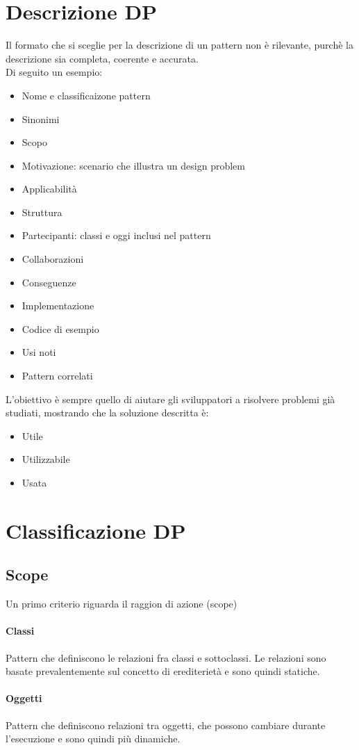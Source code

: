 \section{Descrizione DP}
Il formato che si sceglie per la descrizione di un pattern non è rilevante, purchè la descrizione
sia completa, coerente e accurata.\\
Di seguito un esempio:
\begin{itemize}
    \item Nome e classificaizone pattern
    \item Sinonimi
    \item Scopo
    \item Motivazione: scenario che illustra un design problem
    \item Applicabilità
    \item Struttura
    \item Partecipanti: classi e oggi inclusi nel pattern
    \item Collaborazioni
    \item Conseguenze
    \item Implementazione
    \item Codice di esempio
    \item Usi noti
    \item Pattern correlati
\end{itemize}
L'obiettivo è sempre quello di aiutare gli sviluppatori a risolvere problemi già
studiati, mostrando che la soluzione descritta è:
\begin{itemize}
    \item Utile
    \item Utilizzabile
    \item Usata
\end{itemize}
\section{Classificazione DP}
\subsection*{Scope}
Un primo criterio riguarda il raggion di azione (scope)
\paragraph*{Classi} Pattern che definiscono le relazioni fra classi e sottoclassi. Le relazioni
sono basate prevalentemente sul concetto di erediterietà e sono quindi statiche.
\paragraph*{Oggetti} Pattern che definiscono relazioni tra oggetti, che possono cambiare durante
l'esecuzione e sono quindi più dinamiche.
